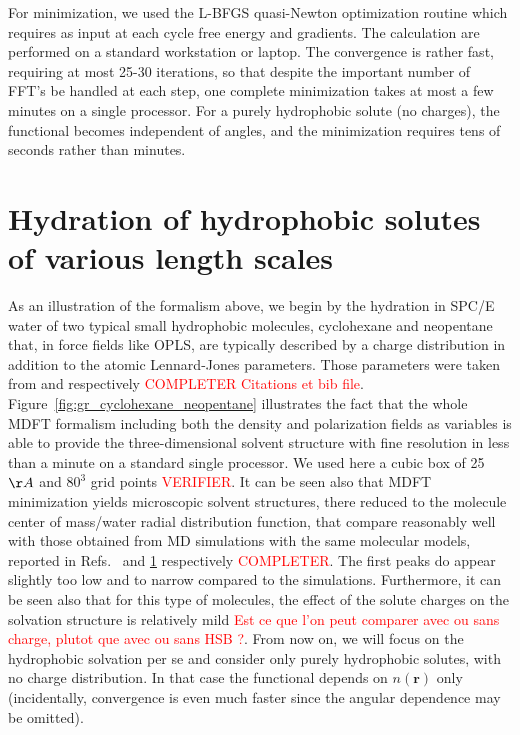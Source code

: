 \documentclass[aip,jcp,preprint]{revtex4-1}
\newcommand{\rr}{\mathbf{r}}
\begin{document}
For minimization, we used the L-BFGS quasi-Newton optimization routine\cite{BFGS} which requires as input at each cycle free energy and gradients.  The calculation are performed on  a standard  workstation or laptop. The convergence is rather fast, requiring at most 25-30 iterations, so that despite the important number of FFT's be handled at each step, one complete minimization takes at most a few minutes on a single processor.  For a purely hydrophobic solute (no charges), the functional becomes independent of angles,  and the minimization requires tens of seconds rather than minutes. 




\section{Hydration of hydrophobic solutes of various length scales}

As an illustration of the formalism above, we begin by the hydration in SPC/E water of two typical small hydrophobic molecules, cyclohexane and neopentane that, in force fields like OPLS, are typically described by a charge distribution in addition to the atomic Lennard-Jones parameters. Those parameters were taken from \cite{} and \cite{} respectively \textcolor{red}{COMPLETER Citations et bib file}. Figure~\ref{fig:gr_cyclohexane_neopentane} illustrates the fact that the whole MDFT formalism including both the density and polarization fields as variables is able to provide the three-dimensional solvent structure with fine resolution in less than a minute on a standard single processor. We used here a cubic box of 25~$\AA$ and $80^3$ grid points \textcolor{red}{VERIFIER}. It can be seen also that MDFT minimization yields  microscopic solvent structures, there reduced to the molecule center of mass/water radial distribution function, that compare reasonably well with those obtained from MD simulations with the same molecular models, reported in  Refs.~\cite{} and \ref{} respectively
\textcolor{red}{COMPLETER}. The first peaks do appear slightly too low and to narrow compared to the simulations. Furthermore, it can be seen also that for this type of molecules, the effect of the solute charges on the solvation structure is relatively mild  \textcolor{red}{Est ce que l'on peut comparer avec ou sans charge, plutot que avec ou sans HSB ?}. From now on, we will focus on the hydrophobic solvation per se and consider only purely hydrophobic solutes, with no charge distribution. In that case the functional depends on $n(\rr)$ only (incidentally, convergence is even much faster since the angular dependence may be omitted).   
\end{document}
